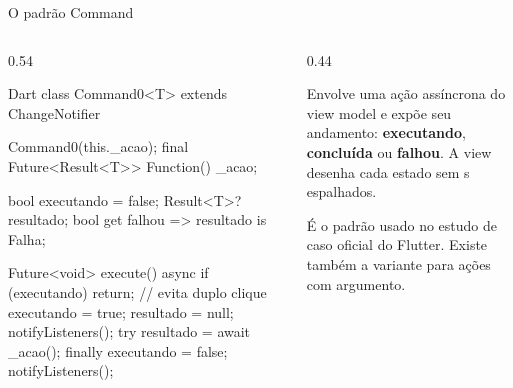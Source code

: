 \documentclass[aspectratio=169,10pt]{beamer}
\begin{document}
\begin{frame}[fragile]{O padrão Command}
  \begin{columns}[T]
    \begin{column}{0.54\textwidth}
\begin{codigo}[title=utils/command.dart (simplificado)]{Dart}
class Command0<T> extends ChangeNotifier {
  Command0(this._acao);
  final Future<Result<T>> Function() _acao;

  bool executando = false;
  Result<T>? resultado;
  bool get falhou => resultado is Falha;

  Future<void> execute() async {
    if (executando) return;          // evita duplo clique
    executando = true;
    resultado = null;
    notifyListeners();
    try {
      resultado = await _acao();
    } finally {
      executando = false;
      notifyListeners();
    }
  }
}
\end{codigo}
    \end{column}
    \begin{column}{0.44\textwidth}
      \begin{conceito}[Command]
        Envolve uma ação assíncrona do view model e expõe seu andamento: \textbf{executando}, \textbf{concluída} ou \textbf{falhou}. A view desenha cada estado sem s espalhados.
      \end{conceito}
      \begin{dica}
        É o padrão usado no estudo de caso oficial do Flutter. Existe também a variante  para ações com argumento.
      \end{dica}
    \end{column}
  \end{columns}
\end{frame}
\end{document}
